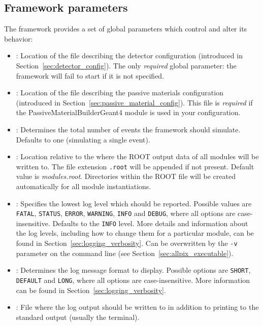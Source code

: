 \begin{itemize}
\section{Framework parameters}
\label{sec:framework_parameters}
The \apsq framework provides a set of global parameters which control and alter its behavior:
\begin{itemize}
\item {}: Location of the file describing the detector configuration (introduced in Section~\ref{sec:detector_config}).
The only \textit{required} global parameter: the framework will fail to start if it is not specified.
\item {}: Location of the file describing the passive materials configuration (introduced in Section~\ref{sec:passive_material_config}).
This file is \textit{required} if the PassiveMaterialBuilderGeant4 module is used in your configuration. 
\item {}: Determines the total number of events the framework should simulate.
Defaults to one (simulating a single event).
\item {}: Location relative to the  where the ROOT output data of all modules will be written to. The file extension \texttt{.root} will be appended if not present.
Default value is \textit{modules.root}.
Directories within the ROOT file will be created automatically for all module instantiations.
\item {}: Specifies the lowest log level which should be reported.
Possible values are \texttt{FATAL}, \texttt{STATUS}, \texttt{ERROR}, \texttt{WARNING}, \texttt{INFO} and \texttt{DEBUG}, where all options are case-insensitive.
Defaults to the \texttt{INFO} level.
More details and information about the log levels, including how to change them for a particular module, can be found in Section~\ref{sec:logging_verbosity}.
Can be overwritten by the \texttt{-v} parameter on the command line (see Section~\ref{sec:allpix_executable}).
\item {}: Determines the log message format to display.
Possible options are \texttt{SHORT}, \texttt{DEFAULT} and \texttt{LONG}, where all options are case-insensitive.
More information can be found in Section~\ref{sec:logging_verbosity}.
\item {}: File where the log output should be written to in addition to printing to the standard output (usually the terminal).

\end{itemize}
\end{itemize}
